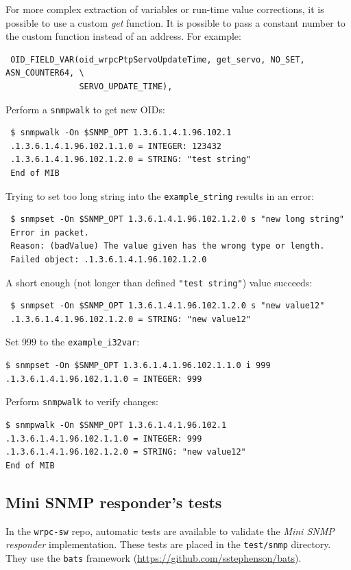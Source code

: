 \documentclass[a4paper, 12pt]{article}
\begin{document}
\begin{itemize*}
For more complex extraction of variables or run-time value corrections,
it is possible to use a custom \textit{get} function. It is possible to pass
a constant number to the custom function instead of an address. For example:
\begin{lstlisting}
 OID_FIELD_VAR(oid_wrpcPtpServoUpdateTime, get_servo, NO_SET, ASN_COUNTER64, \
               SERVO_UPDATE_TIME),
\end{lstlisting}

\end{itemize*}
Perform a \texttt{snmpwalk} to get new OIDs:
\begin{lstlisting}
 $ snmpwalk -On $SNMP_OPT 1.3.6.1.4.1.96.102.1
 .1.3.6.1.4.1.96.102.1.1.0 = INTEGER: 123432
 .1.3.6.1.4.1.96.102.1.2.0 = STRING: "test string"
 End of MIB
\end{lstlisting}
Trying to set too long string into the \texttt{example\_string} results in an error:
\begin{lstlisting}
 $ snmpset -On $SNMP_OPT 1.3.6.1.4.1.96.102.1.2.0 s "new long string"
 Error in packet.
 Reason: (badValue) The value given has the wrong type or length.
 Failed object: .1.3.6.1.4.1.96.102.1.2.0
\end{lstlisting}
A short enough (not longer than defined \texttt{"test string"}) value succeeds:
\begin{lstlisting}
 $ snmpset -On $SNMP_OPT 1.3.6.1.4.1.96.102.1.2.0 s "new value12"
 .1.3.6.1.4.1.96.102.1.2.0 = STRING: "new value12"
\end{lstlisting}
Set 999 to the \texttt{example\_i32var}:
\begin{lstlisting}
$ snmpset -On $SNMP_OPT 1.3.6.1.4.1.96.102.1.1.0 i 999
.1.3.6.1.4.1.96.102.1.1.0 = INTEGER: 999
\end{lstlisting}
Perform \texttt{snmpwalk} to verify changes:
\begin{lstlisting}
$ snmpwalk -On $SNMP_OPT 1.3.6.1.4.1.96.102.1
.1.3.6.1.4.1.96.102.1.1.0 = INTEGER: 999
.1.3.6.1.4.1.96.102.1.2.0 = STRING: "new value12"
End of MIB
\end{lstlisting}

\subsection{Mini SNMP responder's tests}
\label{Mini SNMP responder's tests}

In the \texttt{wrpc-sw} repo, automatic tests are available to validate the \textit{Mini
SNMP responder} implementation. These tests are placed in the \texttt{test/snmp}
directory.
They use the \texttt{bats} framework (\url{https://github.com/sstephenson/bats}).
\end{document}
